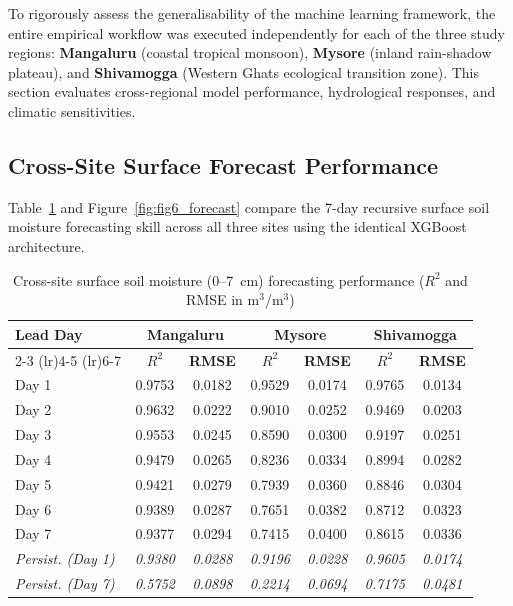 \documentclass[12pt, a4paper]{article}
\begin{document}
To rigorously assess the generalisability of the machine learning framework, the entire empirical workflow was executed independently for each of the three study regions: \textbf{Mangaluru} (coastal tropical monsoon), \textbf{Mysore} (inland rain-shadow plateau), and \textbf{Shivamogga} (Western Ghats ecological transition zone). This section evaluates cross-regional model performance, hydrological responses, and climatic sensitivities.

\subsection{Cross-Site Surface Forecast Performance}

Table~\ref{tab:cross_forecast} and Figure~\ref{fig:fig6_forecast} compare the 7-day recursive surface soil moisture forecasting skill across all three sites using the identical XGBoost architecture.

\begin{table}[H]
\centering
\caption{Cross-site surface soil moisture (0--7~cm) forecasting performance ($R^2$ and RMSE in m$^3$/m$^3$)}
\label{tab:cross_forecast}
\begin{tabular}{lcccccc}
\toprule
\multirow{2}{*}{\textbf{Lead Day}} & \multicolumn{2}{c}{\textbf{Mangaluru}} & \multicolumn{2}{c}{\textbf{Mysore}} & \multicolumn{2}{c}{\textbf{Shivamogga}} \\
\cmidrule(lr){2-3} \cmidrule(lr){4-5} \cmidrule(lr){6-7}
& \textbf{$R^2$} & \textbf{RMSE} & \textbf{$R^2$} & \textbf{RMSE} & \textbf{$R^2$} & \textbf{RMSE} \\
\midrule
Day 1 & 0.9753 & 0.0182 & 0.9529 & 0.0174 & 0.9765 & 0.0134 \\
Day 2 & 0.9632 & 0.0222 & 0.9010 & 0.0252 & 0.9469 & 0.0203 \\
Day 3 & 0.9553 & 0.0245 & 0.8590 & 0.0300 & 0.9197 & 0.0251 \\
Day 4 & 0.9479 & 0.0265 & 0.8236 & 0.0334 & 0.8994 & 0.0282 \\
Day 5 & 0.9421 & 0.0279 & 0.7939 & 0.0360 & 0.8846 & 0.0304 \\
Day 6 & 0.9389 & 0.0287 & 0.7651 & 0.0382 & 0.8712 & 0.0323 \\
Day 7 & 0.9377 & 0.0294 & 0.7415 & 0.0400 & 0.8615 & 0.0336 \\
\midrule
\textit{Persist. (Day 1)} & \textit{0.9380} & \textit{0.0288} & \textit{0.9196} & \textit{0.0228} & \textit{0.9605} & \textit{0.0174} \\
\textit{Persist. (Day 7)} & \textit{0.5752} & \textit{0.0898} & \textit{0.2214} & \textit{0.0694} & \textit{0.7175} & \textit{0.0481} \\
\bottomrule
\end{tabular}
\end{table}
\end{document}
